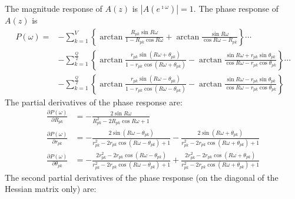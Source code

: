 \documentclass[a4paper,twoside,10pt,english]{report}
\begin{document}
The magnitude response of $A\left(z\right)$ is
$\left|A\left(e^{\imath \omega}\right)\right|=1$. The phase response of
$A\left(z\right)$ is
\begin{align*}
  P\left(\omega\right)=
&-\sum_{k=1}^{V}\left\{
         \arctan\frac{R_{pk}\sin R\omega}{1-R_{pk}\cos R\omega}+
         \arctan\frac{\sin R\omega}{\cos R\omega-R_{pk}}\right\}\cdots\\
&-\sum_{k=1}^{\frac{Q}{2}}\left\{
          \arctan\frac{r_{pk}\sin\left(R\omega+\theta_{pk}\right)}
                       {1-r_{pk}\cos\left(R\omega+\theta_{pk}\right)}-
          \arctan\frac{\sin R\omega+r_{pk}\sin\theta_{pk}}
                       {\cos R\omega-r_{pk}\cos\theta_{pk}}\right\}\cdots\\
&-\sum_{k=1}^{\frac{Q}{2}}\left\{
          \arctan\frac{r_{pk}\sin\left(R\omega-\theta_{pk}\right)}
                      {1-r_{pk}\cos\left(R\omega-\theta_{pk}\right)}-
          \arctan\frac{\sin R\omega-r_{pk}\sin\theta_{pk}}
                       {\cos R\omega-r_{pk}\cos\theta_{pk}}\right\}
\end{align*}
The partial derivatives of the phase response are:
\begin{align*}
  \frac{\partial P\left(\omega\right)}{\partial R_{pk}} &=
 -\frac{2\sin R\omega}{R_{pk}^{2}-2R_{pk}\cos R\omega+1}\\
  \frac{\partial P\left(\omega\right)}{\partial r_{pk}} &=
 -\frac{2\sin \left(R\omega-\theta_{pk}\right)}
       {r_{pk}^{2}-2r_{pk}\cos\left(R\omega-\theta_{pk}\right)+1}
 -\frac{2\sin \left(R\omega+\theta_{pk}\right)}
       {r_{pk}^{2}-2r_{pk}\cos\left(R\omega+\theta_{pk}\right)+1}\\
  \frac{\partial P\left(\omega\right)}{\partial \theta_{pk}} &=
 -\frac{2r_{pk}^{2}-2r_{pk}\cos\left(R\omega-\theta_{pk}\right)}
       {r_{pk}^{2}-2r_{pk}\cos\left(R\omega-\theta_{pk}\right)+1}
 +\frac{2r_{pk}^{2}-2r_{pk}\cos\left(R\omega+\theta_{pk}\right)}
       {r_{pk}^{2}-2r_{pk}\cos\left(R\omega+\theta_{pk}\right)+1}
\end{align*}
The second partial derivatives of the phase response (on the diagonal of the
Hessian matrix only) are:
\end{document}
